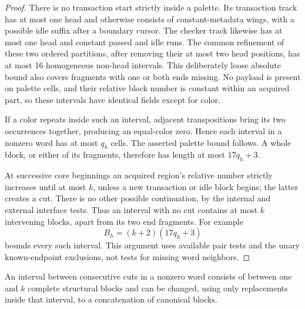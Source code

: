 \begin{proof}
There is no transaction start strictly inside a palette.  Its
transaction track has at most one head and otherwise consists
of constant-metadata wings, with a possible idle suffix after a
boundary cursor.  The checker track likewise has at most one
head and constant passed and idle runs.  The common refinement
of these two ordered partitions, after removing their at most
two head positions, has at most 16 homogeneous non-head
intervals.  This deliberately loose absolute bound also covers
fragments with one or both ends missing.  No payload is present
on palette cells, and their relative block number is constant
within an acquired part, so these intervals have identical
fields except for color.

If a color repeats inside such an interval, adjacent
transpositions bring its two occurrences together, producing an
equal-color zero.  Hence each interval in a nonzero word has at
most $q_h$ cells.  The asserted palette bound follows.  A whole
block, or either of its fragments, therefore has length at most
$17q_h+3$.

At successive core beginnings an acquired region's relative
number strictly increases until at most $k$, unless a new
transaction or idle block begins; the latter creates a cut.
There is no other possible continuation, by the internal and
external interface tests.  Thus an interval with no cut contains
at most $k$ intervening blocks, apart from its two end
fragments.  For example
\[
 B_h=(k+2)(17q_h+3)
\]
bounds every such interval.  This argument uses available pair
tests and the unary known-endpoint exclusions, not tests for
missing word neighbors.
\end{proof}

\begin{lemma}\label{fr:token-normalization}
An interval between consecutive cuts in a nonzero word consists
of between one and $k$ complete structural blocks and can be
changed, using only replacements inside that interval, to a
concatenation of canonical blocks.
\end{lemma}

